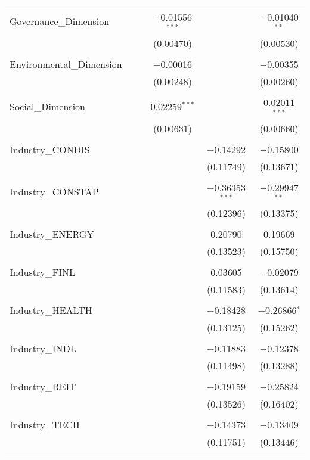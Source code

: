 \begin{table}[!htbp]
\begin{tabular}{@{\extracolsep{5pt}}lccccc}
  & & & & & \\ 
 Governance\_Dimension &  &  & $-$0.01556$^{***}$ &  & $-$0.01040$^{**}$ \\ 
  &  &  & (0.00470) &  & (0.00530) \\ 
  & & & & & \\ 
 Environmental\_Dimension &  &  & $-$0.00016 &  & $-$0.00355 \\ 
  &  &  & (0.00248) &  & (0.00260) \\ 
  & & & & & \\ 
 Social\_Dimension &  &  & 0.02259$^{***}$ &  & 0.02011$^{***}$ \\ 
  &  &  & (0.00631) &  & (0.00660) \\ 
  & & & & & \\ 
 Industry\_CONDIS &  &  &  & $-$0.14292 & $-$0.15800 \\ 
  &  &  &  & (0.11749) & (0.13671) \\ 
  & & & & & \\ 
 Industry\_CONSTAP &  &  &  & $-$0.36353$^{***}$ & $-$0.29947$^{**}$ \\ 
  &  &  &  & (0.12396) & (0.13375) \\ 
  & & & & & \\ 
 Industry\_ENERGY &  &  &  & 0.20790 & 0.19669 \\ 
  &  &  &  & (0.13523) & (0.15750) \\ 
  & & & & & \\ 
 Industry\_FINL &  &  &  & 0.03605 & $-$0.02079 \\ 
  &  &  &  & (0.11583) & (0.13614) \\ 
  & & & & & \\ 
 Industry\_HEALTH &  &  &  & $-$0.18428 & $-$0.26866$^{*}$ \\ 
  &  &  &  & (0.13125) & (0.15262) \\ 
  & & & & & \\ 
 Industry\_INDL &  &  &  & $-$0.11883 & $-$0.12378 \\ 
  &  &  &  & (0.11498) & (0.13288) \\ 
  & & & & & \\ 
 Industry\_REIT &  &  &  & $-$0.19159 & $-$0.25824 \\ 
  &  &  &  & (0.13526) & (0.16402) \\ 
  & & & & & \\ 
 Industry\_TECH &  &  &  & $-$0.14373 & $-$0.13409 \\ 
  &  &  &  & (0.11751) & (0.13446) \\ 
  & & & & & \\ 

\end{tabular}
\end{table}
